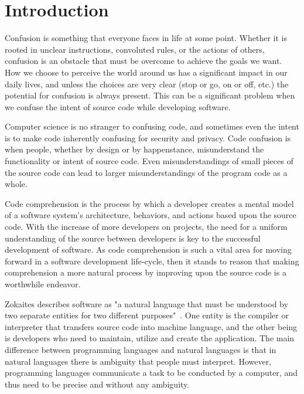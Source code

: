 \section{Introduction}
\begin{quote}
\end{quote}

Confusion is something that everyone faces in life at some point. 
Whether it is rooted in unclear instructions, 
convoluted rules, or the actions of others, confusion is an 
obstacle that must be overcome to achieve the goals 
we want. How we choose to perceive the world around us has a significant impact in our daily
lives, and unless the choices are very clear (stop or go, on or off, etc.) the potential for confusion 
is always present. This can be a significant problem when we confuse the intent of source code while
developing software. 

Computer science is no stranger to confusing code, and 
sometimes even the intent is to make code inherently 
confusing for security and privacy. Code confusion is when people, whether 
by design or by happenstance, misunderstand the functionality or intent of source 
code. Even misunderstandings of small pieces of the source 
code can lead to larger misunderstandings of the program code as a 
whole. 

Code comprehension is the process by which a developer creates a 
mental model of a software system’s architecture, 
behaviors, and actions based upon the source code. With the increase of more developers on projects, the need
for a uniform understanding of the source between developers is key to the successful development of
software.
As code comprehension is such a vital area for moving forward in 
a software development life-cycle, then it stands to reason that 
making comprehension a more natural process by improving upon the source code is a worthwhile endeavor.

Zokaites describes software as "a 
natural language that must be understood by two separate entities 
for two different purposes"~\cite{zokaites_writing_2002}. One entity is the 
compiler or interpreter that transfers source code into machine 
language, and the other being is developers who need to 
maintain, utilize and create the application. The main difference between programming languages
and natural languages is that
in natural languages 
there is ambiguity that people must interpret. However, programming languages communicate a task to be conducted by a
computer, and thus need to be precise and without any ambiguity.

